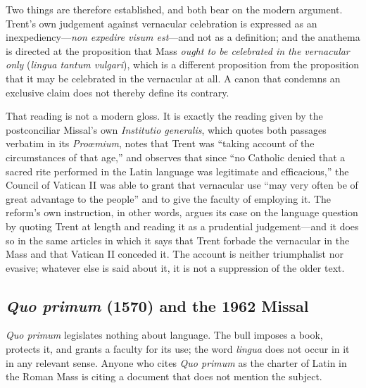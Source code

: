 Two things are therefore established, and both bear on the modern argument. Trent's own judgement against vernacular celebration is expressed as an inexpediency---\emph{non expedire visum est}---and not as a definition; and the anathema is directed at the proposition that Mass \emph{ought to be celebrated in the vernacular only} (\emph{lingua tantum vulgari}), which is a different proposition from the proposition that it may be celebrated in the vernacular at all. A canon that condemns an exclusive claim does not thereby define its contrary.

That reading is not a modern gloss. It is exactly the reading given by the postconciliar Missal's own \emph{Institutio generalis}, which quotes both passages verbatim in its \emph{Proœmium}, notes that Trent was ``taking account of the circumstances of that age,'' and observes that since ``no Catholic denied that a sacred rite performed in the Latin language was legitimate and efficacious,'' the Council of Vatican II was able to grant that vernacular use ``may very often be of great advantage to the people'' and to give the faculty of employing it. The reform's own instruction, in other words, argues its case on the language question by quoting Trent at length and reading it as a prudential judgement---and it does so in the same articles in which it says that Trent forbade the vernacular in the Mass and that Vatican II conceded it. The account is neither triumphalist nor evasive; whatever else is said about it, it is not a suppression of the older text.

\subsection{\emph{Quo primum} (1570) and the 1962 Missal}

\emph{Quo primum} legislates nothing about language. The bull imposes a book, protects it, and grants a faculty for its use; the word \emph{lingua} does not occur in it in any relevant sense. Anyone who cites \emph{Quo primum} as the charter of Latin in the Roman Mass is citing a document that does not mention the subject.

